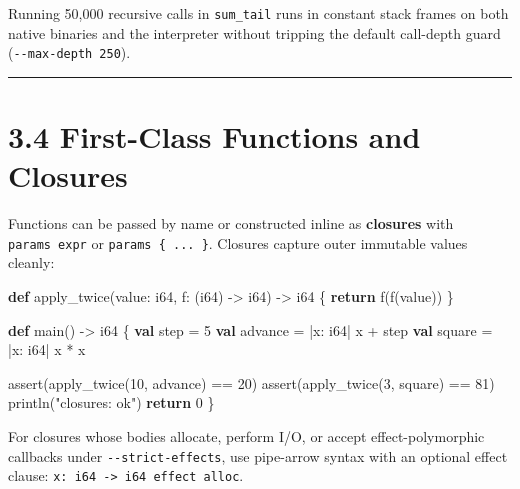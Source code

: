\documentclass[
  english,
  oneside]{book}
\newenvironment{Shaded}{\begin{snugshade}}{\end{snugshade}}
\newcommand{\ControlFlowTok}[1]{\textcolor[rgb]{0.77,0.53,0.75}{\textbf{#1}}}
\newcommand{\DataTypeTok}[1]{\textcolor[rgb]{0.31,0.79,0.69}{#1}}
\newcommand{\DecValTok}[1]{\textcolor[rgb]{0.71,0.81,0.66}{#1}}
\newcommand{\FunctionTok}[1]{\textcolor[rgb]{0.86,0.86,0.67}{#1}}
\newcommand{\KeywordTok}[1]{\textcolor[rgb]{0.34,0.61,0.84}{\textbf{#1}}}
\newcommand{\NormalTok}[1]{\textcolor[rgb]{0.83,0.83,0.83}{#1}}
\newcommand{\OperatorTok}[1]{\textcolor[rgb]{0.83,0.83,0.83}{#1}}
\newcommand{\StringTok}[1]{\textcolor[rgb]{0.81,0.57,0.47}{#1}}
\begin{document}
Running 50,000 recursive calls in \texttt{sum\_tail} runs in constant
stack frames on both native binaries and the interpreter without
tripping the default call-depth guard (\texttt{-\/-max-depth\ 250}).

\begin{center}\rule{0.5\linewidth}{0.5pt}\end{center}

\section{3.4 First-Class Functions and
Closures}\label{first-class-functions-and-closures}

Functions can be passed by name or constructed inline as
\textbf{closures} with \texttt{\textbar{}params\textbar{}\ expr} or
\texttt{\textbar{}params\textbar{}\ \{\ ...\ \}}. Closures capture outer
immutable values cleanly:

\begin{Shaded}
\begin{Highlighting}[]
\KeywordTok{def}\NormalTok{ apply\_twice(value: }\DataTypeTok{i64}\NormalTok{, f: (}\DataTypeTok{i64}\NormalTok{) }\OperatorTok{{-}\textgreater{}} \DataTypeTok{i64}\NormalTok{) }\OperatorTok{{-}\textgreater{}} \DataTypeTok{i64}\NormalTok{ \{}
    \ControlFlowTok{return}\NormalTok{ f(f(value))}
\NormalTok{\}}

\KeywordTok{def}\NormalTok{ main() }\OperatorTok{{-}\textgreater{}} \DataTypeTok{i64}\NormalTok{ \{}
    \KeywordTok{val}\NormalTok{ step }\OperatorTok{=} \DecValTok{5}
    \KeywordTok{val}\NormalTok{ advance }\OperatorTok{=} \OperatorTok{|}\NormalTok{x: }\DataTypeTok{i64}\OperatorTok{|}\NormalTok{ x }\OperatorTok{+}\NormalTok{ step}
    \KeywordTok{val}\NormalTok{ square }\OperatorTok{=} \OperatorTok{|}\NormalTok{x: }\DataTypeTok{i64}\OperatorTok{|}\NormalTok{ x }\OperatorTok{*}\NormalTok{ x}

    \FunctionTok{assert}\NormalTok{(apply\_twice(}\DecValTok{10}\NormalTok{, advance) }\OperatorTok{==} \DecValTok{20}\NormalTok{)}
    \FunctionTok{assert}\NormalTok{(apply\_twice(}\DecValTok{3}\NormalTok{, square) }\OperatorTok{==} \DecValTok{81}\NormalTok{)}
\NormalTok{    println(}\StringTok{"closures: ok"}\NormalTok{)}
    \ControlFlowTok{return} \DecValTok{0}
\NormalTok{\}}
\end{Highlighting}
\end{Shaded}

For closures whose bodies allocate, perform I/O, or accept
effect-polymorphic callbacks under \texttt{-\/-strict-effects}, use
pipe-arrow syntax with an optional effect clause:
\texttt{\textbar{}x:\ i64\textbar{}\ -\textgreater{}\ i64\ effect\ alloc}.
\end{document}
